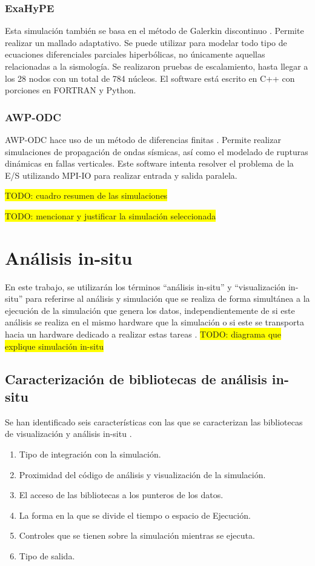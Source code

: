 \subsubsection{ExaHyPE}
  Esta simulación también se basa en el método de Galerkin discontinuo \cite{Reinarz2020}. Permite realizar un mallado adaptativo. Se puede utilizar para modelar todo tipo de ecuaciones diferenciales parciales hiperbólicas, no únicamente aquellas relacionadas a la sismología. Se realizaron pruebas de escalamiento, hasta llegar a los 28 nodos con un total de 784 núcleos. El software está escrito en C++ con porciones en FORTRAN y Python.
\subsubsection{AWP-ODC}
AWP-ODC hace uso de un método de diferencias finitas \cite{Cui2010}. Permite realizar simulaciones de propagación de ondas sísmicas, así como el modelado de rupturas dinámicas en fallas verticales. Este software intenta resolver el problema de la E/S utilizando MPI-IO para realizar entrada y salida paralela.


\colorbox{yellow}{TODO: cuadro resumen de las simulaciones}

\colorbox{yellow}{TODO: mencionar y justificar la simulación seleccionada}
\section{Análisis in-situ}
En este trabajo, se utilizarán los términos ``análisis in-situ'' y ``visualización in-situ'' para referirse al análisis y simulación que se realiza de forma simultánea a la ejecución de la simulación que genera los datos, independientemente de si este análisis se realiza en el mismo hardware que la simulación o si este se transporta hacia un hardware dedicado a realizar estas tareas \cite{childs_terminology_2020}.
\colorbox{yellow}{TODO: diagrama que explique simulación in-situ}
\subsection{Caracterización de bibliotecas de análisis in-situ}
Se han identificado seis características con las que se caracterizan las bibliotecas de visualización y análisis in-situ \cite{childs_terminology_2020}.
\begin{enumerate}
  \item Tipo de integración con la simulación.
  \item Proximidad del código de análisis y visualización de la simulación.
  \item El acceso de las bibliotecas a los punteros de los datos.
  \item La forma en la que se divide el tiempo o espacio de Ejecución.
  \item Controles que se tienen sobre la simulación mientras se ejecuta.
  \item Tipo de salida.
\end{enumerate}
